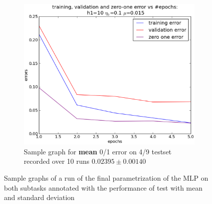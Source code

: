 \begin{figure}[!ht]
\begin{subfigure}[b]{.45\textwidth}
	\includegraphics[width=\textwidth]{mlp/plots/4_9/sample.eps}
	\caption{Sample graph for \textbf{mean} 0/1 error on 4/9 testset recorded over 10 runs $0.02395\pm 0.00140$}
	\label{subfig:result4}
	\end{subfigure}
	\caption{Sample graphs of a run of the final parametrization of the MLP on both subtasks annotated with the performance of test with mean and standard deviation}
	\label{fig:performance_result}
	\end{figure}

